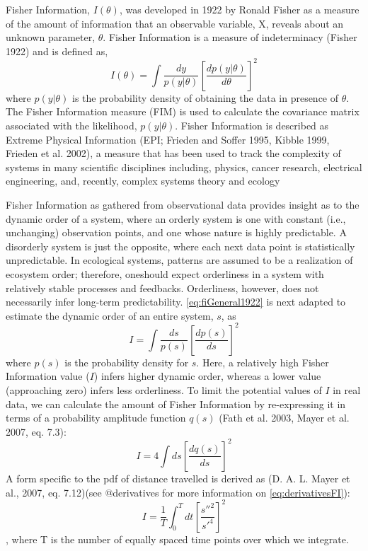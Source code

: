 \documentclass[12pt,twoside,openany]{reedthesis}
\begin{document}
Fisher Information, \(I(\theta)\), was developed in 1922 by Ronald
Fisher as a measure of the amount of information that an observable
variable, X, reveals about an unknown parameter, \(\theta\). Fisher
Information is a measure of indeterminacy (Fisher 1922) and is defined
as,
\begin{equation} 
I(\theta) = \int \frac{dy}{p(y|\theta)}\left[\frac{dp(y|\theta)}{d\theta}\right]^2
\label{eq:fiGeneral1922}
\end{equation}
where \(p(y|\theta)\) is the probability density of obtaining the data
in presence of \(\theta\). The Fisher Information measure (FIM) is used
to calculate the covariance matrix associated with the likelihood,
\(p(y|\theta)\). Fisher Information is described as Extreme Physical
Information (EPI; Frieden and Soffer 1995, Kibble 1999, Frieden et al.
2002), a measure that has been used to track the complexity of systems
in many scientific disciplines including, physics, cancer research,
electrical engineering, and, recently, complex systems theory and
ecology

Fisher Information as gathered from observational data provides insight
as to the dynamic order of a system, where an orderly system is one with
constant (i.e., unchanging) observation points, and one whose nature is
highly predictable. A disorderly system is just the opposite, where each
next data point is statistically unpredictable. In ecological systems,
patterns are assumed to be a realization of ecosystem order; therefore,
oneshould expect orderliness in a system with relatively stable
processes and feedbacks. Orderliness, however, does not necessarily
infer long-term predictability. \eqref{eq:fiGeneral1922} is next adapted
to estimate the dynamic order of an entire system, \(s\), as
\begin{equation} 
I = \int \frac{ds}{p(s)}\left[\frac{dp(s)}{ds}\right]^2
\label{eq:fiAdapted}
\end{equation}
where \(p(s)\) is the probability density for \(s\). Here, a relatively
high Fisher Information value (\(I\)) infers higher dynamic order,
whereas a lower value (approaching zero) infers less orderliness. To
limit the potential values of \(I\) in real data, we can calculate the
amount of Fisher Information by re-expressing it in terms of a
probability amplitude function \(q(s)\) (Fath et al. 2003, Mayer et al.
2007, eq. 7.3):
\begin{equation}
I = 4 \int ds\left[\frac{dq(s)}{ds}\right]^2
\label{eq:fiAmplitude}
\end{equation}
A form specific to the pdf of distance travelled is derived as (D. A. L.
Mayer et al., 2007, eq. 7.12)(see @derivatives for more information on
\eqref{eq:derivativesFI}):
\begin{equation} 
\label{eq:derivativesFI}
I = \frac{1}{T} \int_0^T dt\left[\frac{s''^2}{s'^4}\right]^2
\end{equation}
, where T is the number of equally spaced time points over which we
integrate.
\end{document}
